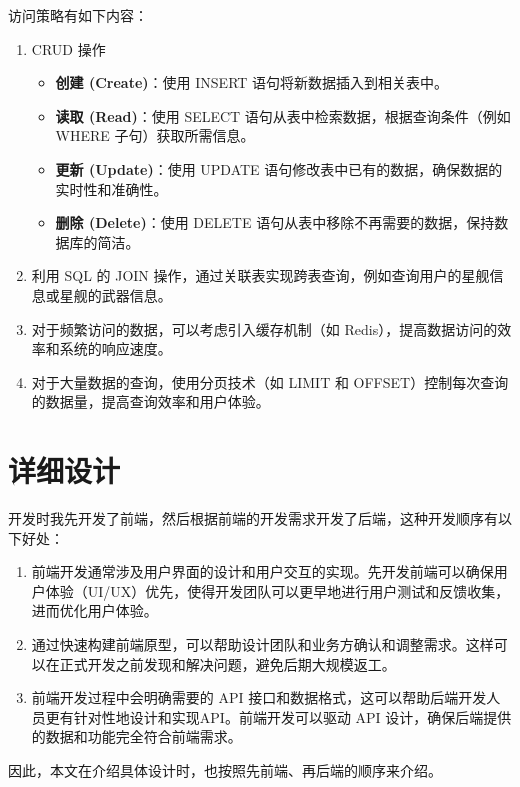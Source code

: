 \documentclass{base}
\begin{document}
访问策略有如下内容：

\begin{enumerate}
	\item CRUD 操作
	\begin{itemize}
		\item \textbf{创建 (Create)}：使用 INSERT 语句将新数据插入到相关表中。
		\item \textbf{读取 (Read)}：使用 SELECT 语句从表中检索数据，根据查询条件（例如 WHERE 子句）获取所需信息。
		\item \textbf{更新 (Update)}：使用 UPDATE 语句修改表中已有的数据，确保数据的实时性和准确性。
		\item \textbf{删除 (Delete)}：使用 DELETE 语句从表中移除不再需要的数据，保持数据库的简洁。
	\end{itemize}
	
	\item 利用 SQL 的 JOIN 操作，通过关联表实现跨表查询，例如查询用户的星舰信息或星舰的武器信息。
	
	\item 对于频繁访问的数据，可以考虑引入缓存机制（如 Redis），提高数据访问的效率和系统的响应速度。
	
	\item 对于大量数据的查询，使用分页技术（如 LIMIT 和 OFFSET）控制每次查询的数据量，提高查询效率和用户体验。
	
\end{enumerate}




\section{详细设计}
开发时我先开发了前端，然后根据前端的开发需求开发了后端，这种开发顺序有以下好处：

\begin{enumerate}
	\item 前端开发通常涉及用户界面的设计和用户交互的实现。先开发前端可以确保用户体验（UI/UX）优先，使得开发团队可以更早地进行用户测试和反馈收集，进而优化用户体验。
	\item 通过快速构建前端原型，可以帮助设计团队和业务方确认和调整需求。这样可以在正式开发之前发现和解决问题，避免后期大规模返工。
	\item 前端开发过程中会明确需要的 API 接口和数据格式，这可以帮助后端开发人员更有针对性地设计和实现API。前端开发可以驱动 API 设计，确保后端提供的数据和功能完全符合前端需求。
\end{enumerate}

因此，本文在介绍具体设计时，也按照先前端、再后端的顺序来介绍。
\end{document}
